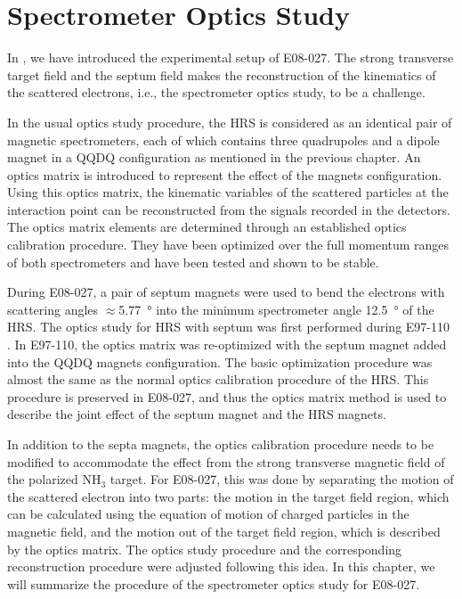 
\chapter{Spectrometer Optics Study}
\label{C6}

In , we have introduced the experimental setup of E08-027. The strong transverse target field and the septum field makes the reconstruction of the kinematics of the scattered electrons, i.e., the spectrometer optics study, to be a challenge.

In the usual optics study procedure, the HRS is considered as an identical pair of magnetic spectrometers, each of which contains three quadrupoles and a dipole magnet in a QQDQ configuration as mentioned in the previous chapter. An optics matrix is introduced to represent the effect of the magnets configuration. Using this optics matrix, the kinematic variables of the scattered particles at the interaction point can be reconstructed from the signals recorded in the detectors. The optics matrix elements are determined through an established optics calibration procedure. They have been optimized over the full momentum ranges of both spectrometers and have been tested and shown to be stable.

During E08-027, a pair of septum magnets were used to bend the electrons with scattering angles $\approx$\SI{5.77}{\degree} into the minimum spectrometer angle \SI{12.5}{\degree} of the HRS. The optics study for HRS with septum was first performed during E97-110 \cite{Sulkosky2005}. In E97-110, the optics matrix was re-optimized with the septum magnet added into the QQDQ magnets configuration. The basic optimization procedure was almost the same as the normal optics calibration procedure of the HRS. This procedure is preserved in E08-027, and thus the optics matrix method is used to describe the joint effect of the septum magnet and the HRS magnets.

In addition to the septa magnets, the optics calibration procedure needs to be modified to accommodate the effect from the strong transverse magnetic field of the polarized NH${}_3$ target. For E08-027, this was done by separating the motion of the scattered electron into two parts: the motion in the target field region, which can be calculated using the equation of motion of charged particles in the magnetic field, and the motion out of the target field region, which is described by the optics matrix. The optics study procedure and the corresponding reconstruction procedure were adjusted following this idea. In this chapter, we will summarize the procedure of the spectrometer optics study for E08-027.

